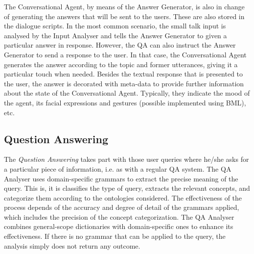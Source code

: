 The Conversational Agent, by means of the Answer Generator, is also in change of generating the answers that will be sent to the users. These are also stored in the dialogue scripts. 
In the most common scenario, the small talk input is analysed by the Input Analyser and tells the Answer Generator to given a particular answer in response.
However, the \ac{QA} can also instruct the Answer Generator to send a response to the user.
In that case, the Conversational Agent generates the answer according to the topic and former utterances, giving it a particular touch when needed.
Besides the textual response that is presented to the user, the answer is decorated with meta-data to provide further information about the state of the Conversational Agent. Typically, they indicate the mood of the agent, its facial expressions and gestures (possible implemented using \ac{BML}), etc.

\subsection{Question Answering}

The {\em Question Answering} takes part with those user queries where he/she asks for a particular piece of information, i.e. as with a regular \ac{QA} system. 
The QA Analyser uses domain-specific grammars to extract the precise meaning of the query.
This is, it is classifies the type of query, extracts the relevant concepts, and categorize them according to the ontologies considered. The effectiveness of the process depends of the accuracy and degree of detail of the grammars applied, which includes the precision of the concept categorization. The QA Analyser combines general-scope dictionaries with domain-specific ones to enhance its effectiveness. If there is no grammar that can be applied to the query, the analysis simply does not return any outcome.

